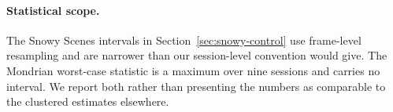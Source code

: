 \paragraph{Statistical scope.} The Snowy Scenes intervals in
Section~\ref{sec:snowy-control} use frame-level resampling and are narrower
than our session-level convention would give. The Mondrian worst-case
statistic is a maximum over nine sessions and carries no interval. We
report both rather than presenting the numbers as comparable to the
clustered estimates elsewhere.
